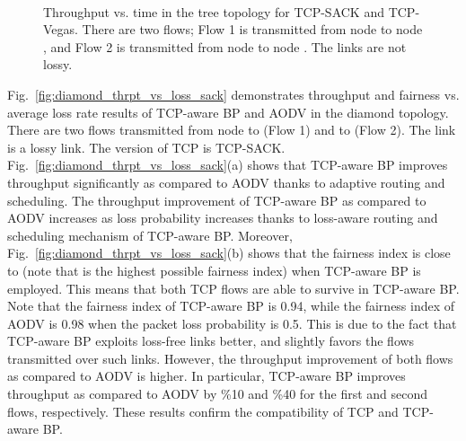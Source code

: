 \documentclass[conference]{IEEEtran}
\begin{document}
\begin{figure}[t!]
\vspace{-0pt}
\begin{center}
 \hspace{-0pt} \\
 \hspace{-0pt}
\end{center}
\begin{center}
\vspace{-5pt}
\caption{\label{fig:tree_thrpt_time_results} \scriptsize  Throughput vs. time in the tree topology for TCP-SACK and TCP-Vegas. There are two flows; Flow 1 is transmitted from node  to node , and Flow 2 is transmitted from node  to node . The links are not lossy.
}
\vspace{-15pt}
\end{center}
\vspace{-10pt}
\end{figure}



Fig.~\ref{fig:diamond_thrpt_vs_loss_sack} demonstrates throughput and fairness vs. average loss rate results of TCP-aware BP and AODV in the diamond topology. There are two flows transmitted from node  to  (Flow 1) and  to  (Flow 2). The link  is a lossy link. The version of TCP is TCP-SACK. Fig.~\ref{fig:diamond_thrpt_vs_loss_sack}(a) shows that TCP-aware BP improves throughput significantly as compared to AODV thanks to adaptive routing and scheduling. The throughput improvement of TCP-aware BP as compared to AODV increases as loss probability increases thanks to loss-aware routing and scheduling mechanism of TCP-aware BP. Moreover, Fig.~\ref{fig:diamond_thrpt_vs_loss_sack}(b) shows that the fairness index is close to  (note that  is the highest possible fairness index) when TCP-aware BP is employed. This means that both TCP flows are able to survive in TCP-aware BP. Note that the fairness index of TCP-aware BP is 0.94, while the fairness index of AODV is 0.98 when the packet loss probability is 0.5. This is due to the fact that TCP-aware BP exploits loss-free links better, and slightly favors the flows transmitted over such links. However, the throughput improvement of both flows as compared to AODV is higher. In particular, TCP-aware BP improves throughput as compared to AODV by \%10 and \%40 for the first and second flows, respectively. These results confirm the compatibility of TCP and TCP-aware BP.
\end{document}
